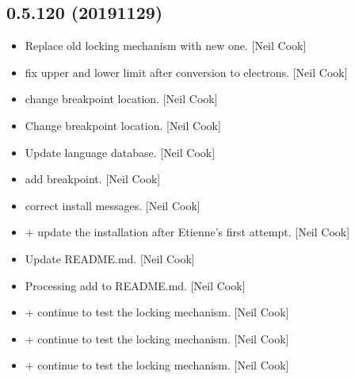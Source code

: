 \documentclass[a4paper,10pt,english]{report}
\begin{document}
\subsection{0.5.120 (2019\sphinxhyphen{}11\sphinxhyphen{}29)}
\label{\detokenize{misc/changelog:id42}}\begin{itemize}
\item {} 
Replace old locking mechanism with new one. {[}Neil Cook{]}

\item {} 
 \sphinxhyphen{} fix upper and lower limit after conversion
to electrons. {[}Neil Cook{]}

\item {} 
 \sphinxhyphen{} change breakpoint location. {[}Neil
Cook{]}

\item {} 
Change breakpoint location. {[}Neil Cook{]}

\item {} 
Update language database. {[}Neil Cook{]}

\item {} 
 \sphinxhyphen{} add breakpoint. {[}Neil Cook{]}

\item {} 
 \sphinxhyphen{} correct install messages.
{[}Neil Cook{]}

\item {} 
 +  \sphinxhyphen{}
update the installation after Etienne’s first attempt. {[}Neil Cook{]}

\item {} 
Update README.md. {[}Neil Cook{]}

\item {} 
Processing add to README.md. {[}Neil Cook{]}

\item {} 
 +  \sphinxhyphen{} continue to test the locking mechanism. {[}Neil
Cook{]}

\item {} 
 +  \sphinxhyphen{} continue to test the locking mechanism. {[}Neil
Cook{]}

\item {} 
 +  \sphinxhyphen{} continue to test the locking mechanism. {[}Neil
Cook{]}


\end{itemize}
\end{document}
